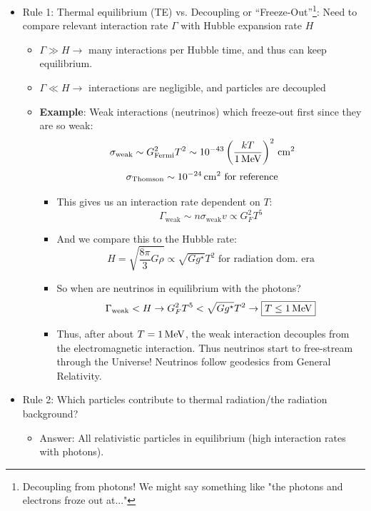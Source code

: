 \documentclass{article}
\newcommand{\unit}[1]{{\,\rm #1}}
\newcommand{\be}{\begin{equation}}
\newcommand{\ee}{\end{equation}}
\newcommand{\cm}{\unit{cm}}
\begin{document}
\begin{itemize}
    \item Rule 1: Thermal equilibrium (TE) vs. Decoupling or ``Freeze-Out''\footnote{Decoupling from photons! We might say something like "the photons and electrons froze out at..."}: Need to compare relevant interaction rate $\Gamma$ with Hubble expansion rate $H$ 
    \begin{itemize}
        \item $\Gamma \gg H \rightarrow$ many interactions per Hubble time, and thus can keep equilibrium. 
        \item $\Gamma \ll H \rightarrow$ interactions are negligible, and particles are decoupled
        \item \textbf{Example}: Weak interactions (neutrinos) which freeze-out first since they are so weak:
        \be
        \sigma_\text{weak} \sim G_\text{Fermi}^2 T^2 \sim 10^{-43} \left(\frac{kT}{1 \unit{MeV}}\right)^2 \cm^2
        \ee
        \be
        \sigma_\text{Thomson} \sim 10^{-24} \cm^2 \text{ for reference}
        \ee
        \begin{itemize}
            \item This gives us an interaction rate dependent on $T$:
            \be
            \Gamma_\text{weak} \sim n \sigma_\text{weak} v \propto G_F^2 T^5
            \ee
            \item And we compare this to the Hubble rate:
            \be
            H = \sqrt{\frac{8\pi}{3}G \rho} \propto \sqrt{G g^\star} T^2 \text{ for radiation dom. era}
            \ee
            \item So when are neutrinos in equilibrium with the photons? 
            \be
            \Gamma_\text{weak} < H \rightarrow G_F^2 T^5 < \sqrt{Gg^\star}T^2 \rightarrow \boxed{T \leq 1 \unit{MeV}} 
            \ee
            \item Thus, after about $T = 1\unit{MeV}$, the weak interaction decouples from the electromagnetic interaction. Thus neutrinos start to free-stream through the Universe! Neutrinos follow geodesics from General Relativity. 
        \end{itemize}
    \end{itemize}
    
    \item Rule 2: Which particles contribute to thermal radiation/the radiation background?
    \begin{itemize}
        \item Answer: All relativistic particles in equilibrium (high interaction rates with photons).  
    \end{itemize}
    

\end{itemize}
\end{document}
